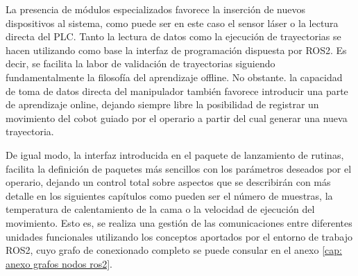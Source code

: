 La presencia de módulos especializados favorece la inserción de nuevos dispositivos al sistema, como puede ser en este caso el sensor láser o la lectura directa del \acrshort{PLC}. Tanto la lectura de datos como la ejecución de trayectorias se hacen utilizando como base la interfaz de programación dispuesta por ROS2. Es decir, se facilita la labor de validación de trayectorias siguiendo fundamentalmente la filosofía del aprendizaje offline.
No obstante. la capacidad de toma de datos directa del manipulador también favorece introducir una parte de aprendizaje online, dejando siempre libre la posibilidad de registrar un movimiento del cobot guiado por el operario a partir del cual generar una nueva trayectoria. 

De igual modo, la interfaz introducida en el paquete de lanzamiento de rutinas, facilita la definición de paquetes más sencillos con los parámetros deseados por el operario, dejando un control total sobre aspectos que se describirán con más detalle en los siguientes capítulos como pueden ser el número de muestras, la temperatura de calentamiento de la cama o la velocidad de ejecución del movimiento. Esto es, se realiza una gestión de las comunicaciones entre diferentes unidades funcionales utilizando los conceptos aportados por el entorno de trabajo ROS2, cuyo grafo de conexionado completo se puede consular en el anexo \ref{cap: anexo grafos nodos ros2}.